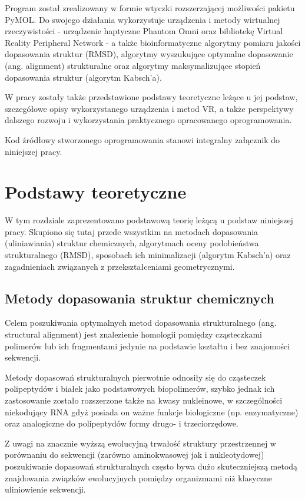 \documentclass[licencjacka]{pracamgr}
\begin{document}
Program został zrealizowany w formie wtyczki rozszerzającej możliwości pakietu PyMOL. Do swojego działania wykorzystuje urządzenia i metody wirtualnej rzeczywistości - urządzenie haptyczne Phantom Omni oraz bibliotekę Virtual Reality Peripheral Network - a także bioinformatyczne algorytmy pomiaru jakości dopasowania struktur (RMSD), algorytmy wyszukujące optymalne dopasowanie (ang. alignment) strukturalne oraz algorytmy maksymalizujące stopień dopasowania struktur (algorytm Kabsch'a).

W pracy zostały także przedstawione podstawy teoretyczne leżące u jej podstaw, szczegółowe opisy wykorzystanego urządzenia i metod VR, a także perspektywy dalszego rozwoju i wykorzystania praktycznego opracowanego oprogramowania.

Kod źródłowy stworzonego oprogramowania stanowi integralny załącznik do niniejszej pracy.

\chapter{Podstawy teoretyczne}
W tym rozdziale zaprezentowano podstawową teorię leżącą u podstaw niniejszej pracy. Skupiono się tutaj przede wszystkim na metodach dopasowania (uliniawiania) struktur chemicznych, algorytmach oceny podobieństwa strukturalnego (RMSD), sposobach ich minimalizacji (algorytm Kabsch'a) oraz zagadnieniach związanych z przekształceniami geometrycznymi.

\section{Metody dopasowania struktur chemicznych}
Celem poszukiwania optymalnych metod dopasowania strukturalnego (ang. structural alignment) jest znalezienie homologii pomiędzy cząsteczkami polimerów lub ich fragmentami jedynie na podstawie kształtu i bez znajomości sekwencji. 

Metody dopasowań strukturalnych pierwotnie odnosiły się do cząsteczek polipeptydów i białek jako podstawowych biopolimerów, szybko jednak ich zastosowanie zostało rozszerzone także na kwasy nukleinowe, w szczególności niekodujący RNA gdyż posiada on ważne funkcje biologiczne (np. enzymatyczne) oraz analogiczne do polipeptydów formy drugo- i trzeciorzędowe. 

Z uwagi na znacznie wyższą ewolucyjną trwałość struktury przestrzennej w porównaniu do sekwencji (zarówno aminokwasowej jak i nukleotydowej) poszukiwanie dopasowań strukturalnych często bywa dużo skuteczniejszą metodą znajdowania związków ewolucyjnych pomiędzy organizmami niż klasyczne uliniowienie sekwencji. 
\end{document}
